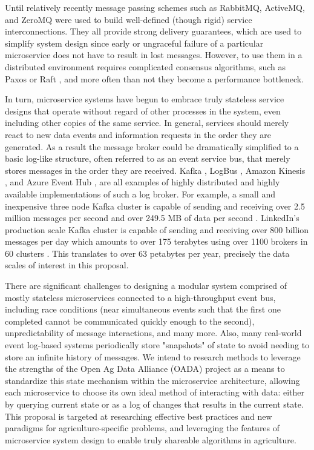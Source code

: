 \documentclass[11pt]{article}
\begin{document}
Until relatively recently message passing schemes such as RabbitMQ, ActiveMQ, and ZeroMQ were used to build well-defined 
(though rigid) service interconnections. They all provide strong delivery guarantees, which are used to simplify system design since 
early or ungraceful failure of a particular microservice does not have to result in lost messages. However, to use them in a distributed 
environment requires complicated consensus algorithms, such as Paxos \cite{Lamport:98} or Raft \cite{Ongaro:14}, and more 
often than not they become a performance bottleneck. 
	
In turn, microservice systems have begun to embrace truly stateless service designs that operate without regard of other 
processes in the system, even including other copies of the same service. In general, services should merely react to new data 
events and information requests in the order they are generated. As a result the message broker could be dramatically simplified to a 
basic log-like structure, often referred to as an event service bus, that merely stores messages in the order they are received. 
Kafka \cite{Kreps:11},
LogBus \cite{Vo:12}, 
Amazon Kinesis \cite{Varia:14}, and Azure Event Hub \cite{Machiraju:15}, are all 
examples of highly distributed and highly available implementations of such a log broker.  For example, a small and inexpensive 
three node Kafka cluster is capable of sending and receiving over 2.5 million messages per second and over 249.5 MB of data per 
second \cite{Kreps:14}. LinkedIn's production scale Kafka cluster is capable of sending and receiving over 800 billion messages per day 
which amounts to over 175 terabytes using over 1100 brokers in 60 clusters
\cite{Palino:15}.  This translates to over 63 petabytes per year, 
precisely the data scales of interest in this proposal.

There are significant challenges to designing a modular system comprised of mostly stateless microservices connected to a 
high-throughput event bus, including race conditions (near simultaneous events such that the first one completed cannot be 
communicated quickly enough to the second), unpredictability of message interactions, and many more.  Also, many real-world 
event log-based systems periodically store "snapshots" of state to avoid needing to store an infinite history of messages.  We intend to 
research methods to leverage the strengths of the Open Ag Data Alliance (OADA) project as a means to standardize this state mechanism 
within the microservice architecture, allowing each microservice to choose its own ideal method of interacting with data: either by querying 
current state or as a log of changes that results in the current state.  This proposal is targeted at researching effective best practices 
and new paradigms for agriculture-specific problems, and leveraging the features of microservice system design to enable truly shareable 
algorithms in agriculture.
\end{document}
